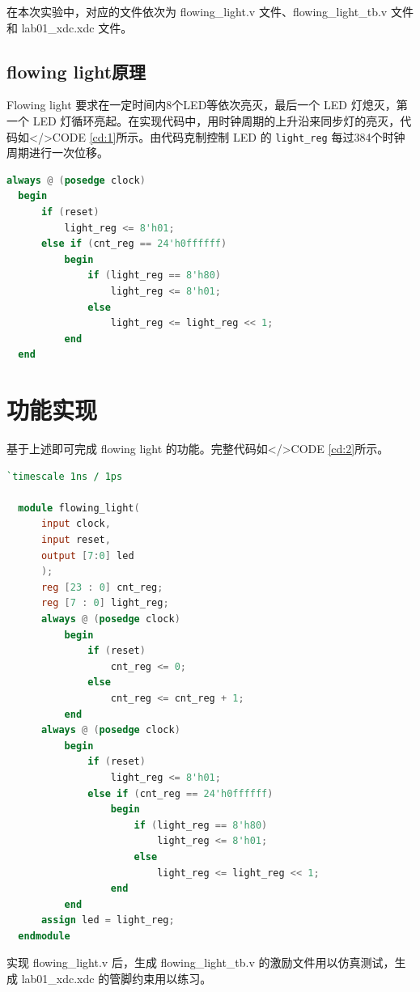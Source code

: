 \documentclass{progartcn}
\begin{document}
在本次实验中，对应的文件依次为 flowing\_light.v 文件、flowing\_light\_tb.v 文件和 lab01\_xdc.xdc 文件。

\subsection{flowing light原理}

Flowing light 要求在一定时间内8个LED等依次亮灭，最后一个 LED 灯熄灭，第一个 LED 灯循环亮起。在实现代码中，用时钟周期的上升沿来同步灯的亮灭，代码如</>CODE \ref{cd:1}所示。由代码克制控制 LED 的 \verb|light_reg| 每过384个时钟周期进行一次位移。

\begin{lstlisting}[language=verilog,caption={flowing light实现},label={cd:1}]
  always @ (posedge clock)
  begin
      if (reset)
          light_reg <= 8'h01;
      else if (cnt_reg == 24'h0ffffff)
          begin
              if (light_reg == 8'h80)
                  light_reg <= 8'h01;
              else
                  light_reg <= light_reg << 1;
          end
  end
\end{lstlisting}

\section{功能实现}

基于上述即可完成 flowing light 的功能。完整代码如</>CODE \ref{cd:2}所示。

\begin{lstlisting}[language=verilog,caption={flowing\_light.v},label={cd:2}]
  `timescale 1ns / 1ps 
  
  module flowing_light(
      input clock,
      input reset,
      output [7:0] led
      );
      reg [23 : 0] cnt_reg;
      reg [7 : 0] light_reg;
      always @ (posedge clock)
          begin
              if (reset)
                  cnt_reg <= 0;
              else
                  cnt_reg <= cnt_reg + 1;
          end
      always @ (posedge clock)
          begin
              if (reset)
                  light_reg <= 8'h01;
              else if (cnt_reg == 24'h0ffffff)
                  begin
                      if (light_reg == 8'h80)
                          light_reg <= 8'h01;
                      else
                          light_reg <= light_reg << 1;
                  end
          end
      assign led = light_reg;
  endmodule
\end{lstlisting}

实现 flowing\_light.v 后，生成 flowing\_light\_tb.v 的激励文件用以仿真测试，生成 lab01\_xdc.xdc 的管脚约束用以练习。
\end{document}
